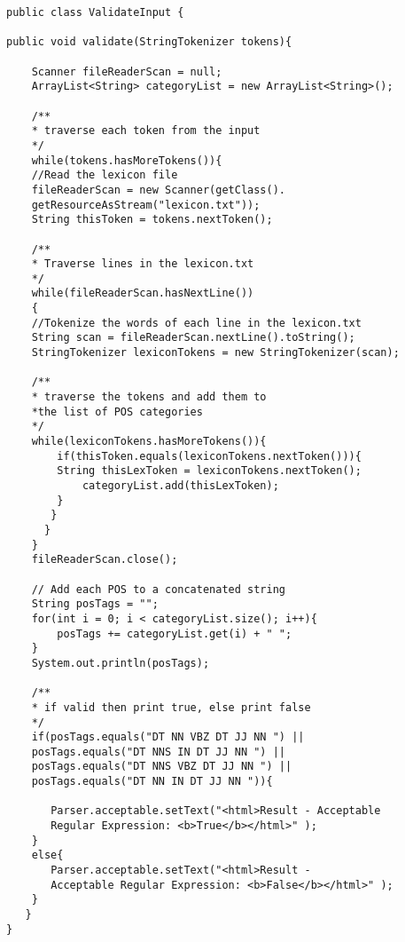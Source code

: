 \begin{lstlisting}
public class ValidateInput {

public void validate(StringTokenizer tokens){

	Scanner fileReaderScan = null;
	ArrayList<String> categoryList = new ArrayList<String>();
	
	/**
	* traverse each token from the input
	*/
	while(tokens.hasMoreTokens()){
	//Read the lexicon file
	fileReaderScan = new Scanner(getClass().
	getResourceAsStream("lexicon.txt"));
	String thisToken = tokens.nextToken();
	
	/**
	* Traverse lines in the lexicon.txt
	*/
	while(fileReaderScan.hasNextLine())
	{	
	//Tokenize the words of each line in the lexicon.txt
	String scan = fileReaderScan.nextLine().toString();
	StringTokenizer lexiconTokens = new StringTokenizer(scan);
	
	/**
	* traverse the tokens and add them to 
	*the list of POS categories
	*/
	while(lexiconTokens.hasMoreTokens()){
    	if(thisToken.equals(lexiconTokens.nextToken())){
	   	String thisLexToken = lexiconTokens.nextToken();
	    	categoryList.add(thisLexToken);
	    }	
	   }
   	  }
	}
	fileReaderScan.close();
	
	// Add each POS to a concatenated string
	String posTags = "";
	for(int i = 0; i < categoryList.size(); i++){
   		posTags += categoryList.get(i) + " ";
	}
	System.out.println(posTags);
	
	/**
	* if valid then print true, else print false
	*/
	if(posTags.equals("DT NN VBZ DT JJ NN ") || 
	posTags.equals("DT NNS IN DT JJ NN ") ||
	posTags.equals("DT NNS VBZ DT JJ NN ") || 
	posTags.equals("DT NN IN DT JJ NN ")){
	
	   Parser.acceptable.setText("<html>Result - Acceptable 
	   Regular Expression: <b>True</b></html>" );
	}
	else{
	   Parser.acceptable.setText("<html>Result - 
	   Acceptable Regular Expression: <b>False</b></html>" );
	}
   }
}
\end{lstlisting}


